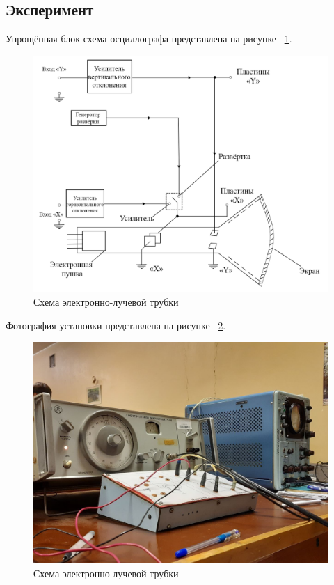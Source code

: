 \subsection{Эксперимент}
Упрощённая блок-схема осциллографа представлена на рисунке ~\ref{fig:Упрощённая блок-схема}.

\begin{figure}[H]
\centering
\includegraphics[width=1.0\textwidth]{Упрощённая блок-схема.png}
\caption{Схема электронно-лучевой трубки}
\label{fig:Упрощённая блок-схема}
\end{figure}

Фотография установки представлена на рисунке ~\ref{fig:Фотография установки}.

\begin{figure}[H]
\centering
\includegraphics[width=1.0\textwidth]{Фотография установки.jpg}
\caption{Схема электронно-лучевой трубки}
\label{fig:Фотография установки}
\end{figure}

